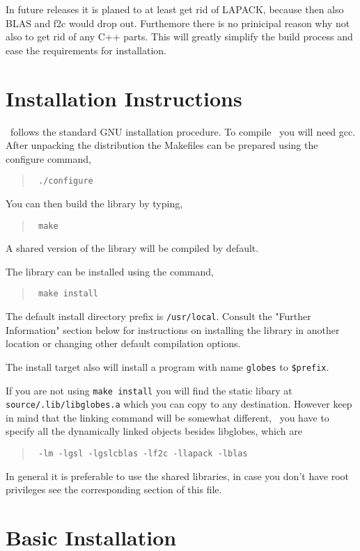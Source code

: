 \begin{appendix}
In future releases it is planed to at least get rid of LAPACK, because
then also BLAS and f2c would drop out. Furthemore there is no prinicipal
reason why not also to get rid of any C++ parts. This will greatly simplify
the build process and ease the requirements for installation.

\section*{Installation Instructions}

\GLOBES\ follows the standard GNU installation procedure.  To compile \GLOBES\
you will need gcc.  After unpacking the distribution
the Makefiles can be prepared using the configure command,
\begin{quote}
{\tt
./configure
}
\end{quote}
You can then build the library by typing,
\begin{quote}
{\tt
make
}
\end{quote}
A shared  version of the library will be compiled by
default. 
 
The library can be installed using the command,
\begin{quote}
{\tt
make install
}
\end{quote}
The default install directory prefix is \verb+/usr/local+.  Consult the
"Further Information" section below for instructions on installing the
library in another location or changing other default compilation
options.

The install target also will install a program with name \verb+globes+ to
\verb+$prefix+.

If you are not using \verb+make install+ you will find the static libary
at \verb+source/.lib/libglobes.a+ which you can copy to any destination.
However keep in mind that the linking command will be somewhat different,
\ie\ you have to specify all the dynamically linked objects besides libglobes,
which are
\begin{quote}
{\tt
         -lm -lgsl -lgslcblas -lf2c -llapack -lblas
}
\end{quote}

In general it is preferable to use the shared libraries, in case you don't
have root privileges see the corresponding section of this file.
 
\section*{Basic Installation}


\end{appendix}
